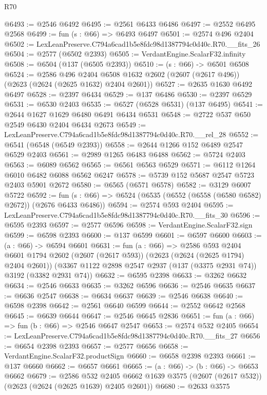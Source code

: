 \begin{lexlean}{R70}
\begin{coremodule}
@6493 := @2546 @6492
@6495 := @2561 @6433 @6486
@6497 := @2552 @6495 @2568
@6499 := fun (s : @66) => @6493 @6497
@6501 := @2574 @496 @2404
@6502 := LexLeanPreserve.C794a6cad1b5e8fdc98d1387794c0d40c.R70.__fits_26
@6504 := @2577 (@6502 @2393)
@6505 := VerdantEngine.ScalarF32.infinity
@6508 := @6504 (@137 (@6505 @2393))
@6510 := (s : @66) -> @6501 @6508
@6524 := @2586
    @496
    @2404
    @6508
    @1632
    @2602
    (@2607 (@2617 @496))
    (@2623 (@2624 (@2625 @1632) @2404 @2601))
@6527 := @2635 @1630 @6492 @6497
@6528 := @2397 @6434
@6529 := @137 @6486
@6530 := @2397 @6529
@6531 := @6530 @2403
@6535 := @6527 (@6528 @6531) (@137 @6495)
@6541 := @2644 @1627 @1629 @6480 @6491 @6434 @6531
@6548 := @2722 @537 @650 @2549 @6430 @2404 @6434 @2673
@6549 := LexLeanPreserve.C794a6cad1b5e8fdc98d1387794c0d40c.R70.__rel_28
@6552 := @6541 (@6548 (@6549 @2393))
@6558 := @2644 @1266 @152 @6489 @2547 @6529 @2403
@6561 := @2989 @1265 @6483 @6488
@6562 := @5724 @2403
@6563 := @6089 @6562
@6565 := @6561 @6563 @6529
@6571 := @6112 @1264 @6010 @6482 @6088 @6562 @6247
@6578 := @5739 @152 @5687 @2547 @5723 @2403 @5901 @2672
@6580 := @6565 (@6571 @6578)
@6582 := @3129 @6007 @5722
@6592 := fun (s : @66) => @6524 (@6535 (@6552 (@6558 (@6580 @6582) @2672)) (@2676 @6433 @6486))
@6594 := @2574 @593 @2404
@6595 := LexLeanPreserve.C794a6cad1b5e8fdc98d1387794c0d40c.R70.__fits_30
@6596 := @6595 @2393
@6597 := @2577 @6596
@6598 := VerdantEngine.ScalarF32.sign
@6599 := @6598 @2393
@6600 := @137 @6599
@6601 := @6597 @6600
@6603 := (a : @66) -> @6594 @6601
@6631 := fun (a : @66) =>
  @2586
    @593
    @2404
    @6601
    @1794
    @2602
    (@2607 (@2617 @593))
    (@2623 (@2624 (@2625 @1794) @2404 @2601))
    (@3367 @1122 @2898 @2547 @2937 (@137 (@3375 @2931 @74)) @3192 (@3382 @2931 @74))
@6632 := @6595 @2398
@6633 := @3262 @6632
@6634 := @2546 @6633
@6635 := @3262 @6596
@6636 := @2546 @6635
@6637 := @6636 @2547
@6638 := @6634 @6637
@6639 := @2546 @6638
@6640 := @6598 @2398
@6642 := @2561 @6640 @6599
@6644 := @2552 @6642 @2568
@6645 := @6639 @6644
@6647 := @2546 @6645 @2836
@6651 := fun (a : @66) => fun (b : @66) => @2546 @6647 @2547
@6653 := @2574 @532 @2405
@6654 := LexLeanPreserve.C794a6cad1b5e8fdc98d1387794c0d40c.R70.__fits_27
@6656 := @6654 @2398 @2393
@6657 := @2577 @6656
@6658 := VerdantEngine.ScalarF32.productSign
@6660 := @6658 @2398 @2393
@6661 := @137 @6660
@6662 := @6657 @6661
@6665 := (a : @66) -> (b : @66) -> @6653 @6662
@6679 := @2586
    @532
    @2405
    @6662
    @1639
    @3575
    (@2607 (@2617 @532))
    (@2623 (@2624 (@2625 @1639) @2405 @2601))
@6680 := @2633 @3575

\end{coremodule}
\end{lexlean}
